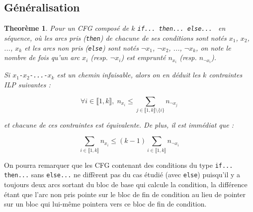 \documentclass[french]{article}
\newtheorem{theorem}{Theorème}
\begin{document}
  \subsection{Généralisation}
  \begin{theorem}
    Pour un CFG composé de $k$ \texttt{if... then... else... } en séquence, où les arcs pris (\texttt{then}) de chacune de ses conditions sont notés $x_1$, $x_2$, ..., $x_k$ et les arcs non pris (\texttt{else}) sont notés $\neg x_1$, $\neg x_2$, ..., $\neg x_k$, on note le nombre de fois qu'un arc $x_i$ (resp. $\neg x_i$) est emprunté $n_{x_i}$ (resp. $n_{\neg x_i}$).

    Si $x_1$\texttt{-}$x_2$\texttt{-...-}$x_k$ est un chemin infaisable, alors on en déduit les $k$ contraintes ILP suivantes :

    \[\forall i \in \llbracket 1, k \rrbracket,\; n_{x_i} \leq \sum_{j \in \llbracket 1, k \rrbracket \setminus \{i\}} n_{\neg x_j} \]

    et chacune de ces contraintes est équivalente. De plus, il est immédiat que : %

    \[ \sum_{i \in \llbracket 1, k \rrbracket} n_{x_i} \leq (k-1) \sum_{i \in \llbracket 1, k \rrbracket} n_{\neg x_i} \]
  \end{theorem}

  On pourra remarquer que les CFG contenant des conditions du type \texttt{if... then...} sans \texttt{else...} ne diffèrent pas du cas étudié (avec \texttt{else}) puisqu'il y a toujours deux arcs sortant du bloc de base qui calcule la condition, la différence étant que l'arc non pris pointe sur le bloc de fin de condition au lieu de pointer sur un bloc qui lui-même pointera vers ce bloc de fin de condition.
\end{document}

